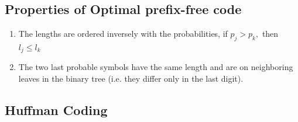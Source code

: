\documentclass[12pt]{article}
\begin{document}
\subsection{Properties of Optimal prefix-free code}
\begin{enumerate}
\item The lengths are ordered inversely with the probabilities, if $p_j > p_k,$ then $\mathit{l}_j \le \mathit{l}_k$  
\item The two last probable symbols have the same length and are on neighboring leaves in the binary tree (i.e. they differ only in the last digit).
\end{enumerate}

\subsection{Huffman Coding}
\end{document}

